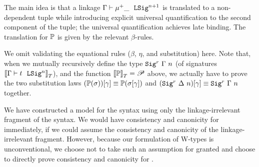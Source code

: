 The main idea is that
a linkage $ {\Gamma} \vdash {\mu^+ \_} \ \ \texttt{LSig}^{n+1} $
is translated to a non-dependent tuple while introducing explicit universal
quantification to the second component of the tuple;
the universal quantification achieves late binding.
The translation for $\mathbb{P}$ is given by the relevant $\beta$-rules.


We omit validating the equational rules ($\beta$, $\eta$, and substitution) here.
Note that, when we mutually recursively define the type
${{ \texttt{Sig}^r_{}~{\Gamma}~{n} }}$ (of signatures ${{\llbracket {\ensuremath{ {\Gamma} \vdash {t} \ \ \texttt{LSig}^{n} }} \rrbracket}_T}$), and the function
${{\llbracket {\ensuremath{\mathbb{P}}} \rrbracket}_T} = \mathscr{P}$ above, we actually have to prove the two substitution laws
${(\mathbb{P}({\sigma}))}\!\left[{\gamma}\right]\equiv \mathbb{P}({{\sigma}\!\left[{\gamma}\right]})$ and ${({ \texttt{Sig}^r_{}~{\Delta}~{n} })}\!\left[{\gamma}\right]
\equiv {\ensuremath{ \texttt{Sig}^r_{}~{\Gamma}~{n} }}$ together. 


We have constructed a model for the \TT syntax using
only the linkage-irrelevant fragment of the syntax.
%
%
We would have consistency and canonicity for \TT immediately, if we could assume
the consistency and canonicity of the linkage-irrelevant fragment.
However, because our formulation of W-types is unconventional,
we choose not to take such an assumption for granted and choose to directly prove
consistency and canonicity for \TT.


